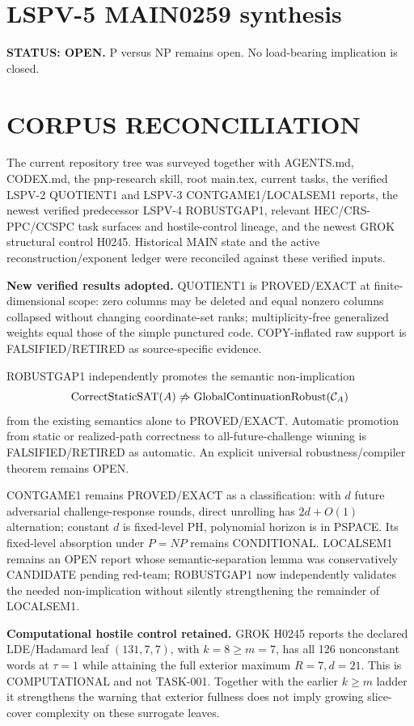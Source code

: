 \documentclass[11pt]{article}
\begin{document}
\section*{LSPV-5 MAIN0259 synthesis}
\textbf{STATUS: OPEN.} P versus NP remains open. No load-bearing implication is closed.

\section*{CORPUS RECONCILIATION}
The current repository tree was surveyed together with AGENTS.md, CODEX.md, the pnp-research skill, root main.tex, current tasks, the verified LSPV-2 QUOTIENT1 and LSPV-3 CONTGAME1/LOCALSEM1 reports, the newest verified predecessor LSPV-4 ROBUSTGAP1, relevant HEC/CRS-PPC/CCSPC task surfaces and hostile-control lineage, and the newest GROK structural control H0245. Historical MAIN state and the active reconstruction/exponent ledger were reconciled against these verified inputs.

\textbf{New verified results adopted.}
QUOTIENT1 is PROVED/EXACT at finite-dimensional scope: zero columns may be deleted and equal nonzero columns collapsed without changing coordinate-set ranks; multiplicity-free generalized weights equal those of the simple punctured code. COPY-inflated raw support is FALSIFIED/RETIRED as source-specific evidence.

ROBUSTGAP1 independently promotes the semantic non-implication
\[
\operatorname{CorrectStaticSAT}(A)\not\Rightarrow
\operatorname{GlobalContinuationRobust}({\cal C}_A)
\]
from the existing semantics alone to PROVED/EXACT. Automatic promotion from static or realized-path correctness to all-future-challenge winning is FALSIFIED/RETIRED as automatic. An explicit universal robustness/compiler theorem remains OPEN.

CONTGAME1 remains PROVED/EXACT as a classification: with \(d\) future adversarial challenge-response rounds, direct unrolling has \(2d+O(1)\) alternation; constant \(d\) is fixed-level PH, polynomial horizon is in PSPACE. Its fixed-level absorption under \(P=NP\) remains CONDITIONAL. LOCALSEM1 remains an OPEN report whose semantic-separation lemma was conservatively CANDIDATE pending red-team; ROBUSTGAP1 now independently validates the needed non-implication without silently strengthening the remainder of LOCALSEM1.

\textbf{Computational hostile control retained.}
GROK H0245 reports the declared LDE/Hadamard leaf \((131,7,7)\), with \(k=8\ge m=7\), has all 126 nonconstant words at \(\tau=1\) while attaining the full exterior maximum \(R=7,d=21\). This is COMPUTATIONAL and not TASK-001. Together with the earlier \(k\ge m\) ladder it strengthens the warning that exterior fullness does not imply growing slice-cover complexity on these surrogate leaves.
\end{document}
